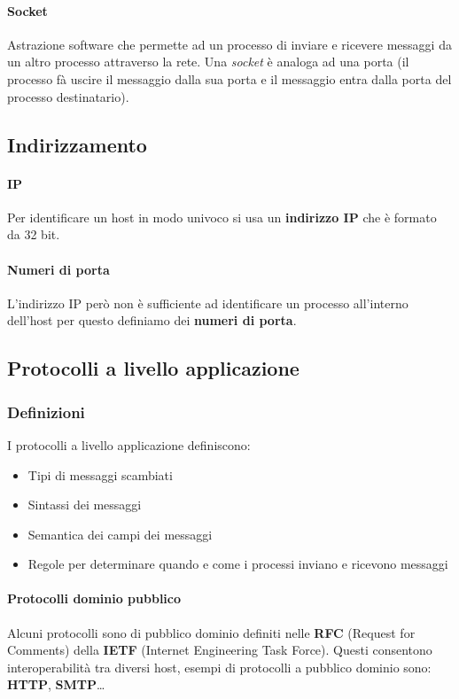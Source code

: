             \paragraph{Socket} Astrazione software che permette ad un processo di inviare e ricevere messaggi da un altro processo attraverso la rete.\newline
            Una \textit{socket} è analoga ad una porta (il processo fà uscire il messaggio dalla sua porta e il messaggio entra dalla porta del processo destinatario).

    \subsection{Indirizzamento}
        \paragraph{IP} Per identificare un host in modo univoco si usa un \textbf{indirizzo IP} che è formato da 32 bit. 

        \paragraph{Numeri di porta} L'indirizzo IP però non è sufficiente ad identificare un processo all'interno dell'host per questo definiamo dei \textbf{numeri di porta}.

    \subsection{Protocolli a livello applicazione}
        \subsubsection{Definizioni}
            I protocolli a livello applicazione definiscono:
                \begin{itemize}
                    \item Tipi di messaggi scambiati
                    \item Sintassi dei messaggi
                    \item Semantica dei campi dei messaggi
                    \item Regole per determinare quando e come i processi inviano e ricevono messaggi
                \end{itemize}
            \paragraph{Protocolli dominio pubblico}Alcuni protocolli sono di pubblico dominio definiti nelle \textbf{RFC} (Request for Comments) della \textbf{IETF} (Internet Engineering Task Force). Questi consentono interoperabilità tra diversi host, esempi di protocolli a pubblico dominio sono: \textbf{HTTP}, \textbf{SMTP}\dots
